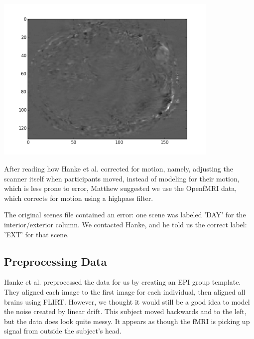 \documentclass[11pt]{article}
\begin{document}
\begin{center}                                                                  
\includegraphics[height=8cm]{1}                                                 
\end{center}    
After reading how Hanke et al. corrected for motion, namely, adjusting the 
scanner itself when participants moved, instead of modeling for their motion, 
which is less prone to error, Matthew suggested we use the OpenfMRI data, 
which corrects for motion using a highpass filter.

The original scenes file contained an error: one scene was labeled 'DAY' for 
the interior/exterior column.  We contacted Hanke, and he told us the correct 
label: 'EXT' for that scene.     
   
\subsection{Preprocessing Data}                      

Hanke et al. preprocessed the data for us by creating an EPI group template.    
They aligned each image to the first image for each individual, then aligned    
all brains using FLIRT.  However, we thought it would still be a good idea to   
model the noise created by linear drift.  This subject moved backwards and to   
the left, but the data does look quite messy.  It appears as though the fMRI    
is picking up signal from outside the subject's head.
\end{document}
